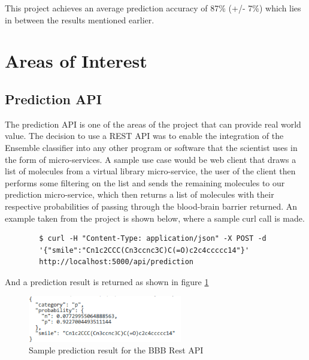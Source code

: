 \documentclass[a4paper,12pt]{article}
\begin{document}
		This project achieves an average prediction accuracy of 87\% (+/- 7\%) which lies in between the results mentioned earlier.
\section{Areas of Interest}
	\subsection{Prediction API}
	The prediction API is one of the areas of the project that can provide real world value. The decision to use a REST API was to enable the integration of the Ensemble classifier into any other program or software that the scientist uses in the form of micro-services. A sample use case would be web client that draws a list of molecules from a virtual library micro-service, the user of the client then performs some filtering on the list and sends the remaining molecules to our prediction micro-service, which then returns a list of molecules with their respective probabilities of passing through the blood-brain barrier returned. An example taken from the project is shown below, where a sample curl call is made.
		\begin{verbatim}
		$ curl -H "Content-Type: application/json" -X POST -d 
		'{"smile":"Cn1c2CCC(Cn3ccnc3C)C(=O)c2c4ccccc14"}'   
		http://localhost:5000/api/prediction
		\end{verbatim}
	And a prediction result is returned as shown in figure \ref{fig:bbb_sample_prediction_result} 
		\begin{figure}[H]
			\centering
			\includegraphics[width=0.6\textwidth,scale=1]{sample_prediction_result}
			\caption{Sample prediction result for the BBB Rest API}
			\label{fig:bbb_sample_prediction_result}
		\end{figure}
\end{document}
